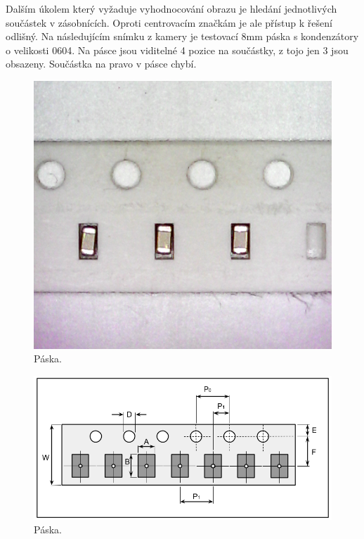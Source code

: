 Dalším úkolem který vyžaduje vyhodnocování obrazu je hledání jednotlivých součástek v zásobnících. Oproti centrovacím značkám je ale přístup k řešení odlišný. Na následujícím snímku z kamery je testovací 8mm páska s kondenzátory o velikosti 0604. Na pásce jsou viditelné 4 pozice na součástky, z tojo jen 3 jsou obsazeny. Součástka na pravo v pásce chybí.

\begin{figure}[h!]
  \centering
    \includegraphics[width=0.5\linewidth]{obrazky/tape3.png}%
    \caption{Páska.}
    \label{fig:tape}
\end{figure}

\begin{figure}[h!]
  \centering
    \includegraphics[width=0.8\linewidth]{obrazky/tape.png}%
    \caption{Páska.}
    \label{fig:tape2}
\end{figure}

